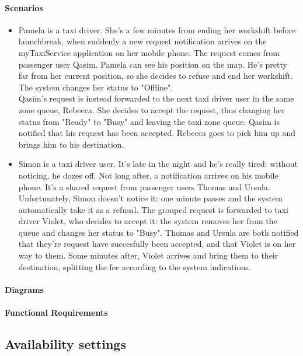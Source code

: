 \paragraph{Scenarios}
\begin{itemize}
	\item Pamela is a taxi driver. She's a few minutes from ending her workshift before launchbreak, when suddenly a new request notification arrives on the myTaxiService application on her mobile phone. The request comes from passenger user Qasim. Pamela can see his position on the map. He's pretty far from her current position, so she decides to refuse and end her workshift. The system changes her status to "Offline".\\
Qasim's request is instead forwarded to the next taxi driver user in the same zone queue, Rebecca. She decides to accept the request, thus changing her status from "Ready" to "Busy" and leaving the taxi zone queue. Qasim is notified that his request has been accepted. Rebecca goes to pick him up and brings him to his destination.
	
	\item Simon is a taxi driver user. It's late in the night and he's really tired: without noticing, he dozes off. Not long after, a notification arrives on his mobile phone. It's a shared request from passenger users Thomas and Ursula. Unfortunately, Simon doesn't notice it: one minute passes and the system automatically take it as a refusal. The grouped request is forwarded to taxi driver Violet, who decides to accept it: the system removes her from the queue and changes her status to "Busy". Thomas and Ursula are both notified that they're request have succesfully been accepted, and that Violet is on her way to them. Some minutes after, Violet arrives and bring them to their destination, splitting the fee according to the system indications.
\end{itemize}

\paragraph{Diagrams}

\paragraph{Functional Requirements}

\subsection{Availability settings}


